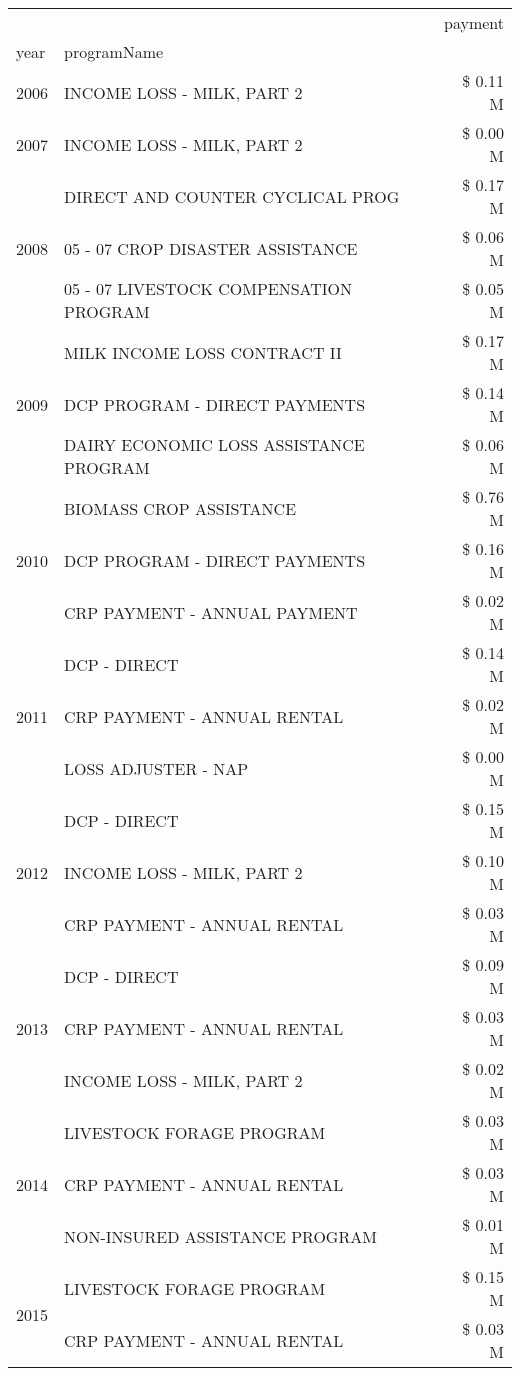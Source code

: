 \begin{tabular}{llr}
\toprule
 &  & payment \\
year & programName &  \\
\midrule
2006 & INCOME LOSS - MILK, PART 2 & \$ 0.11 M \\
\cline{1-3}
2007 & INCOME LOSS - MILK, PART 2 & \$ 0.00 M \\
\cline{1-3}
\multirow[t]{3}{*}{2008} & DIRECT AND COUNTER CYCLICAL PROG & \$ 0.17 M \\
 & 05 - 07 CROP DISASTER ASSISTANCE & \$ 0.06 M \\
 & 05 - 07 LIVESTOCK COMPENSATION PROGRAM & \$ 0.05 M \\
\cline{1-3}
\multirow[t]{3}{*}{2009} & MILK INCOME LOSS CONTRACT II & \$ 0.17 M \\
 & DCP PROGRAM - DIRECT PAYMENTS & \$ 0.14 M \\
 & DAIRY ECONOMIC LOSS ASSISTANCE PROGRAM & \$ 0.06 M \\
\cline{1-3}
\multirow[t]{3}{*}{2010} & BIOMASS CROP ASSISTANCE & \$ 0.76 M \\
 & DCP PROGRAM - DIRECT PAYMENTS & \$ 0.16 M \\
 & CRP PAYMENT - ANNUAL PAYMENT & \$ 0.02 M \\
\cline{1-3}
\multirow[t]{3}{*}{2011} & DCP - DIRECT & \$ 0.14 M \\
 & CRP PAYMENT - ANNUAL RENTAL & \$ 0.02 M \\
 & LOSS ADJUSTER - NAP & \$ 0.00 M \\
\cline{1-3}
\multirow[t]{3}{*}{2012} & DCP - DIRECT & \$ 0.15 M \\
 & INCOME LOSS - MILK, PART 2 & \$ 0.10 M \\
 & CRP PAYMENT - ANNUAL RENTAL & \$ 0.03 M \\
\cline{1-3}
\multirow[t]{3}{*}{2013} & DCP - DIRECT & \$ 0.09 M \\
 & CRP PAYMENT - ANNUAL RENTAL & \$ 0.03 M \\
 & INCOME LOSS - MILK, PART 2 & \$ 0.02 M \\
\cline{1-3}
\multirow[t]{3}{*}{2014} & LIVESTOCK FORAGE PROGRAM & \$ 0.03 M \\
 & CRP PAYMENT - ANNUAL RENTAL & \$ 0.03 M \\
 & NON-INSURED ASSISTANCE PROGRAM & \$ 0.01 M \\
\cline{1-3}
\multirow[t]{3}{*}{2015} & LIVESTOCK FORAGE PROGRAM & \$ 0.15 M \\
 & CRP PAYMENT - ANNUAL RENTAL & \$ 0.03 M \\

\end{tabular}
